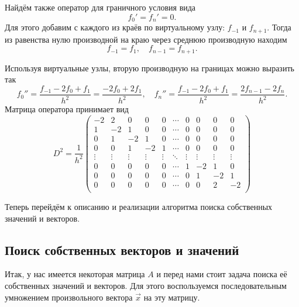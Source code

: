 \documentclass[a4paper,12pt]{article}
\begin{document}
	Найдём также оператор для граничного условия вида
	\[
		f_0' = f_n' = 0.
	\]
	Для этого добавим с каждого из краёв по виртуальному узлу: \( f_{-1} \) и \( f_{n+1} \). Тогда из равенства нулю производной на краю через среднюю производную находим
	\[
		f_{-1} = f_{1},\quad f_{n-1} = f_{n+1}.
	\]

	Используя виртуальные узлы, вторую производную на границах можно выразить так
	\[
		f_0'' = \frac{f_{-1} - 2 f_0 + f_1}{h^2} = \frac{-2f_0 + 2 f_1}{h^2}, \quad
		f_n'' = \frac{f_{-1} - 2 f_0 + f_1}{h^2} = \frac{2 f_{n-1}-2f_n}{h^2}.
	\]
	Матрица оператора принимает вид
	\[
		D^2 = \frac{1}{h^2}
		\begin{pmatrix}
			-2 & 2 &  0 &  0 & 0 & \cdots & 0 & 0 & 0 & 0 \\
			1 & -2 &  1 &  0 & 0 & \cdots & 0 & 0 & 0 & 0 \\
			0 &  1 & -2 &  1 & 0 & \cdots & 0 & 0 & 0 & 0 \\
			0 &  0 &  1 & -2 & 1 & \cdots & 0 & 0 & 0 & 0 \\
			\vdots&\vdots&\vdots&\vdots&\vdots&\ddots&\vdots&\vdots&\vdots&\vdots\\
			0 &  0 &  0 &  0 & 0 & \cdots &  1 & -2 &  1 & 0 \\
			0 &  0 &  0 &  0 & 0 & \cdots &  0 &  1 & -2 & 1 \\
			0 &  0 &  0 &  0 & 0 & \cdots &  0 &  0 &  2 & -2 \\
		\end{pmatrix}
	\]

	Теперь перейдём к описанию и реализации алгоритма поиска собственных значений и векторов.

	\subsection{Поиск собственных векторов и значений}

	Итак, у нас имеется некоторая матрица \( A \) и перед нами стоит задача поиска её собственных значений и векторов. Для этого воспользуемся последовательным умножением произвольного вектора \( \vec{x} \) на эту матрицу.
\end{document}
